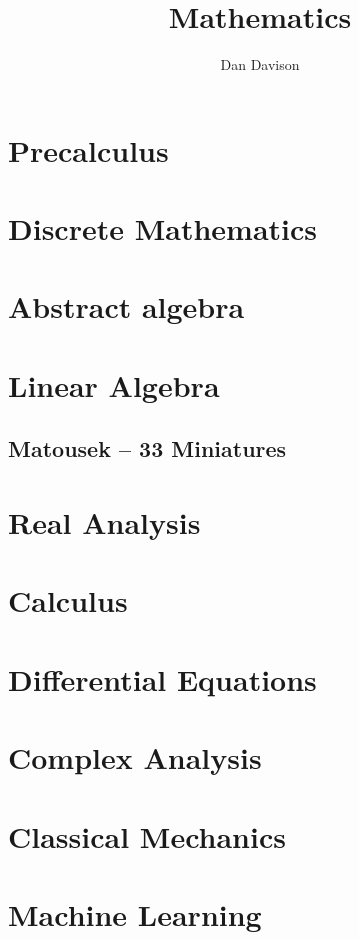 \documentclass{book}
\title{Mathematics}
\author{Dan Davison}
\begin{document}
\frontmatter
\maketitle
\tableofcontents
\mainmatter


\chapter{Precalculus}


\chapter{Discrete Mathematics}


\chapter{Abstract algebra}


\chapter{Linear Algebra}

\section{Matousek -- 33 Miniatures}


\chapter{Real Analysis}


\chapter{Calculus}



\chapter{Differential Equations}


\chapter{Complex Analysis}


\chapter{Classical Mechanics}


\chapter{Machine Learning}


\end{document}
